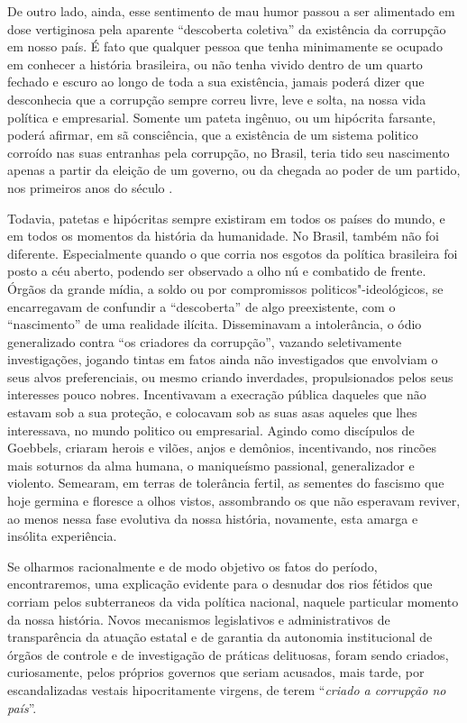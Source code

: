 De outro lado, ainda, esse sentimento de mau humor passou a ser
alimentado em dose vertiginosa pela aparente ``descoberta coletiva'' da
existência da corrupção em nosso país. É fato que qualquer pessoa que
tenha minimamente se ocupado em conhecer a história brasileira, ou não
tenha vivido dentro de um quarto fechado e escuro ao longo de toda a sua
existência, jamais poderá dizer que desconhecia que a corrupção sempre
correu livre, leve e solta, na nossa vida política e empresarial.
Somente um pateta ingênuo, ou um hipócrita farsante, poderá afirmar, em
sã consciência, que a existência de um sistema politico corroído nas
suas entranhas pela corrupção, no Brasil, teria tido seu nascimento
apenas a partir da eleição de um governo, ou da chegada ao poder de um
partido, nos primeiros anos do século .

Todavia, patetas e hipócritas sempre existiram em todos os países do
mundo, e em todos os momentos da história da humanidade. No Brasil,
também não foi diferente. Especialmente quando o que corria nos esgotos
da política brasileira foi posto a céu aberto, podendo ser observado a
olho nú e combatido de frente. Órgãos da grande mídia, a soldo ou por
compromissos politicos"-ideológicos, se encarregavam de confundir a
``descoberta'' de algo preexistente, com o ``nascimento'' de uma
realidade ilícita. Disseminavam a intolerância, o ódio generalizado
contra ``os criadores da corrupção'', vazando seletivamente
investigações, jogando tintas em fatos ainda não investigados que
envolviam o seus alvos preferenciais, ou mesmo criando inverdades,
propulsionados pelos seus interesses pouco nobres. Incentivavam a
execração pública daqueles que não estavam sob a sua proteção, e
colocavam sob as suas asas aqueles que lhes interessava, no mundo
politico ou empresarial. Agindo como discípulos de Goebbels, criaram
herois e vilões, anjos e demônios, incentivando, nos rincões mais
soturnos da alma humana, o maniqueísmo passional, generalizador e
violento. Semearam, em terras de tolerância fertil, as sementes do
fascismo que hoje germina e floresce a olhos vistos, assombrando os que
não esperavam reviver, ao menos nessa fase evolutiva da nossa história,
novamente, esta amarga e insólita experiência.

Se olharmos racionalmente e de modo objetivo os fatos do período,
encontraremos, uma explicação evidente para o desnudar dos rios fétidos
que corriam pelos subterraneos da vida política nacional, naquele
particular momento da nossa história. Novos mecanismos legislativos e
administrativos de transparência da atuação estatal e de garantia da
autonomia institucional de órgãos de controle e de investigação de
práticas delituosas, foram sendo criados, curiosamente, pelos próprios
governos que seriam acusados, mais tarde, por escandalizadas vestais
hipocritamente virgens, de terem ``\emph{criado a corrupção no país}''.

